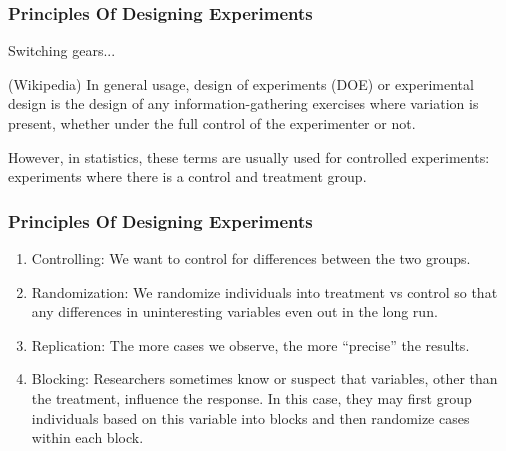 \documentclass[handout]{beamer}
\newcommand{\blue}[1]{\textcolor{blue2}{#1}}
\begin{document}
\begin{frame}
\frametitle{Principles Of Designing Experiments}

Switching gears...

\vspace{0.5cm}

(Wikipedia) In general usage, \blue{design of experiments (DOE) or experimental design} is the design of any information-gathering exercises where variation is present, whether under the full control of the experimenter or not. 

\vspace{0.5cm}

\pause However, in statistics, these terms are usually used for \blue{controlled experiments}: experiments where there is a control and treatment group.

\end{frame}


\begin{frame}
\frametitle{Principles Of Designing Experiments}

%
%
\begin{enumerate}
\pause\item\blue{Controlling}:  We want to control for differences between the two groups.
\pause\item\blue{Randomization}: We randomize individuals into treatment vs control so that any differences in uninteresting variables even out in the long run.  
\pause\item\blue{Replication}:  The more cases we observe, the more ``precise'' the results.
\pause\item\blue{Blocking}:  Researchers sometimes know or suspect that variables, other than the treatment, influence the response. In this case, they may first group individuals based on this variable into blocks and then randomize cases within each block.  
\end{enumerate}

\end{frame}
\end{document}
